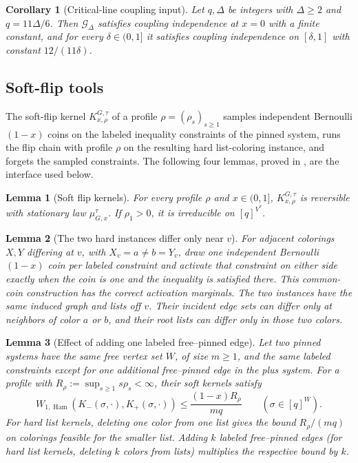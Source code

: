 \documentclass[11pt,reqno]{article}
\theoremstyle{plain}
\newtheorem{lemma}[lemma]{Lemma}
\newtheorem{corollary}[corollary]{Corollary}
\theoremstyle{definition}
\theoremstyle{remark}
\DeclareMathOperator{\Ham}{Ham}
\newcommand{\Deg}{\Delta}                        %
\newcommand{\WHam}{W_{1,\Ham}}                   %
\newcommand{\colours}{[q]}                        %
\newcommand{\Gdeg}{\mathcal{G}_{\Deg}}
\newcommand{\mupin}[3]{\mu_{#1,#3}^{#2}}
\begin{document}
\begin{corollary}[Critical-line coupling input]
\label{cor:critical-line-input}
Let \(q,\Deg\) be integers with \(\Deg\ge2\) and \(q=11\Deg/6\).
Then \(\Gdeg\) satisfies coupling independence at \(x=0\) with a finite
constant, and for every \(\delta\in(0,1]\) it satisfies coupling
independence on \([\delta,1]\) with constant \(12/(11\delta)\).
\end{corollary}

\subsection{Soft-flip tools}
\label{sec:soft-flip-interface}

The soft-flip kernel \(K_{x,\rho}^{G,\tau}\) of a profile
\(\rho=(\rho_s)_{s\ge1}\) samples independent Bernoulli\((1-x)\) coins on
the labeled inequality constraints of the pinned system, runs the flip
chain with profile \(\rho\) on the resulting hard list-coloring
instance, and forgets the sampled constraints.  The following four
lemmas, proved in \cite{ShaoShi2026ZeroFreeness}, are the interface used below.

\begin{lemma}[Soft flip kernels]\label{lem:soft-stationary}
For every profile \(\rho\) and \(x\in(0,1]\),
\(K_{x,\rho}^{G,\tau}\) is reversible with stationary law
\(\mupin{G}{\tau}{x}\).  If \(\rho_1>0\), it is irreducible on
\(\colours^{V^\tau}\).
\end{lemma}

\begin{lemma}[The two hard instances differ only near \(v\)]
\label{lem:coupled-activation-root-local}
For adjacent colorings \(X,Y\) differing at \(v\), with
\(X_v=a\ne b=Y_v\), draw one independent Bernoulli\((1-x)\) coin per
labeled constraint and activate that constraint on either side exactly
when the coin is one and the inequality is satisfied there.  This
common-coin construction has the correct activation marginals.
The two instances have the same induced graph and lists off \(v\).  Their
incident edge sets can differ only at neighbors of color \(a\) or
\(b\), and their root lists can differ only in those two colors.
\end{lemma}

\begin{lemma}[Effect of adding one labeled free--pinned edge]
\label{lem:boundary-sensitivity}
Let two pinned systems have the same free vertex set \(W\), of size
\(m\ge1\), and the same labeled constraints except for one additional
free--pinned edge in the plus system.  For a profile with
\(R_\rho:=\sup_{s\ge1}s\rho_s<\infty\), their soft kernels satisfy
\begin{equation}\label{eq:one-boundary-row}
  \WHam(K_-(\sigma,\cdot),K_+(\sigma,\cdot))
  \le\frac{(1-x)R_\rho}{mq}
  \qquad(\sigma\in\colours^W).
\end{equation}
For hard list kernels, deleting one color from one list gives the bound
\(R_\rho/(mq)\) on colorings feasible for the smaller list.
Adding \(k\) labeled free--pinned edges (for hard list kernels,
deleting \(k\) colors from lists) multiplies the respective bound
by \(k\).
\end{lemma}
\end{document}
